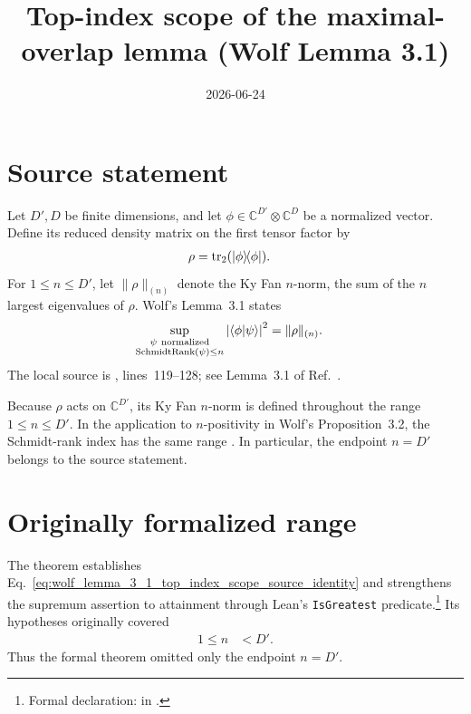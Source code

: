 \documentclass{article}
\title{Top-index scope of the maximal-overlap lemma (Wolf Lemma 3.1)}
\author{}
\date{2026-06-24}
\begin{document}
\maketitle
{}

\section{Source statement}

Let $D',D$ be finite dimensions, and let
$\phi\in\mathbb C^{D'}\otimes\mathbb C^D$ be a normalized vector. Define its
reduced density matrix on the first tensor factor by
\begin{align}
    \rho
        &=\operatorname{tr}_2(|\phi\rangle\!\langle \phi|).
    \label{eq:wolf_lemma_3_1_top_index_scope_reduced_density}
\end{align}
For $1\leq n\leq D'$, let $\|\rho\|_{(n)}$ denote the Ky Fan $n$-norm, the
sum of the $n$ largest eigenvalues of $\rho$. Wolf's Lemma~3.1 states
\begin{align}
    \sup_{\substack{\psi\ \mathrm{normalized}\\
                    \operatorname{SchmidtRank}(\psi)\leq n}}
        \left|\langle \phi | \psi \rangle\right|^2
        &=\|\rho\|_{(n)}.
    \label{eq:wolf_lemma_3_1_top_index_scope_source_identity}
\end{align}
The local source is
,
lines~119--128; see Lemma~3.1 of Ref.~\cite{Wolf2012Quantum}.

Because $\rho$ acts on $\mathbb C^{D'}$, its Ky Fan $n$-norm is defined
throughout the range $1\leq n\leq D'$. In the application to $n$-positivity
in Wolf's Proposition~3.2, the Schmidt-rank index has the same range
\cite[Proposition~3.2]{Wolf2012Quantum}. In particular, the endpoint $n=D'$
belongs to the source statement.

\section{Originally formalized range}

The theorem
 establishes
Eq.~\ref{eq:wolf_lemma_3_1_top_index_scope_source_identity} and strengthens
the supremum assertion to attainment through Lean's \texttt{IsGreatest}
predicate.\footnote{Formal declaration:
     in
    .}
Its hypotheses originally covered
\begin{align}
    1\leq n
        &<D'.
    \label{eq:wolf_lemma_3_1_top_index_scope_original_formal_range}
\end{align}
Thus the formal theorem omitted only the endpoint $n=D'$.
\end{document}
